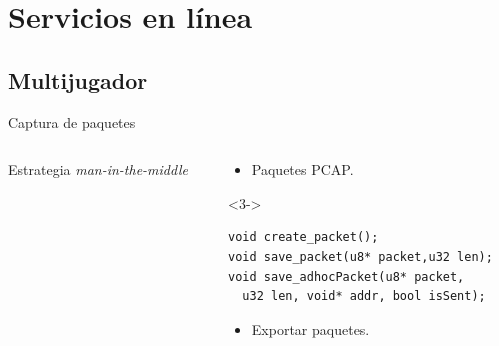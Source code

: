 
\section{Servicios en línea}
\subsection{Multijugador}
\begin{frame}[fragile]{Captura de paquetes}
\begin{columns}

\begin{column}{0.35\textwidth}
Estrategia \textit{man-in-the-middle}
\begin{center}
\end{center}
\end{column}

\begin{column}{0.5\textwidth}
\begin{itemize}
    \item<3-> Paquetes PCAP.
\end{itemize}
\begin{uncoverenv}<3->\begin{lstlisting}
void create_packet();
void save_packet(u8* packet,u32 len);
void save_adhocPacket(u8* packet,
  u32 len, void* addr, bool isSent);
\end{lstlisting}\end{uncoverenv}

\begin{itemize}
    \item<4-> Exportar paquetes.
\end{itemize}
\vfill
{}
\end{column}

\end{columns}
\end{frame}

